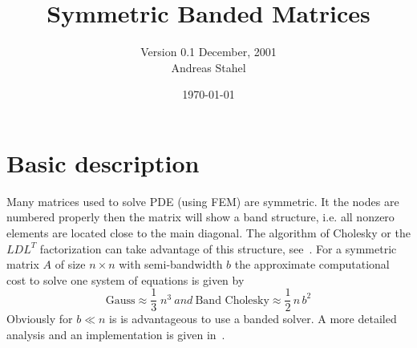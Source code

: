 \documentclass[11pt]{article}
\title{Symmetric Banded Matrices}
\author{Version 0.1 December, 2001\\
Andreas Stahel
}
\date{\today}
\newcommand{\text}[1]{\ #1 \ }
\begin{document}
\newcommand{\currdir}{./}

\maketitle
%

\def\currdir{./}
\newcommand\ID[1]{\index{#1}}
\setlength{\marginparwidth}{25mm}



\newcommand\DF[1]{$^*$\marginpar{#1}}


\tableofcontents




\section{Basic description}
Many  matrices used to solve PDE (using FEM) are symmetric. It the
nodes are numbered properly then the matrix will show
a band structure, i.e. all nonzero elements are located close to the main
diagonal. The algorithm of Cholesky or the $LDL^T$ factorization can take
advantage of this structure, see~\cite{GoluVanLoan96}. For a symmetric
matrix $A$ of size $n\times n$ with semi-bandwidth $b$ the approximate
computational cost to solve one system of equations is 
given by
\[ \mbox{Gauss}\approx \frac{1}{3}\;n^3 \text{and}
 \mbox{Band Cholesky}\approx \frac{1}{2}\,n\,b^2\]
Obviously for $b\ll n$ is is advantageous to
use a banded solver. A more detailed analysis and an implementation is
given in~\cite{VarFem}.
\end{document}
